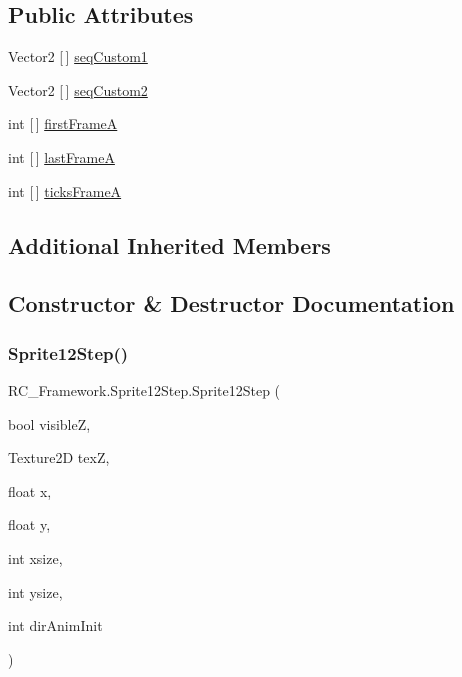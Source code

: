 \subsection*{Public Attributes}
\begin{DoxyCompactItemize}
\item 
Vector2 \mbox{[}$\,$\mbox{]} \mbox{\hyperlink{class_r_c___framework_1_1_sprite12_step_a463df891e22a00e32cc6ae8b111f2a78}{seq\+Custom1}}
\item 
Vector2 \mbox{[}$\,$\mbox{]} \mbox{\hyperlink{class_r_c___framework_1_1_sprite12_step_a82153c0bc2b6faa5deeee80b9b4bb719}{seq\+Custom2}}
\item 
int \mbox{[}$\,$\mbox{]} \mbox{\hyperlink{class_r_c___framework_1_1_sprite12_step_a441555ad253837fd1114e86766549371}{first\+FrameA}}
\item 
int \mbox{[}$\,$\mbox{]} \mbox{\hyperlink{class_r_c___framework_1_1_sprite12_step_a6596bdfab654dae9b28fa7753711c6e6}{last\+FrameA}}
\item 
int \mbox{[}$\,$\mbox{]} \mbox{\hyperlink{class_r_c___framework_1_1_sprite12_step_a2139a295caeb42b010216f4bed307972}{ticks\+FrameA}}
\end{DoxyCompactItemize}
\subsection*{Additional Inherited Members}


\subsection{Constructor \& Destructor Documentation}
\mbox{\label{class_r_c___framework_1_1_sprite12_step_aed9fb46b122f42a6291527345d7fe390}} 
\subsubsection{\texorpdfstring{Sprite12\+Step()}{Sprite12Step()}}
{\footnotesize\ttfamily R\+C\+\_\+\+Framework.\+Sprite12\+Step.\+Sprite12\+Step (\begin{DoxyParamCaption}\item[{bool}]{visibleZ,  }\item[{Texture2D}]{texZ,  }\item[{float}]{x,  }\item[{float}]{y,  }\item[{int}]{xsize,  }\item[{int}]{ysize,  }\item[{int}]{dir\+Anim\+Init }\end{DoxyParamCaption})}



